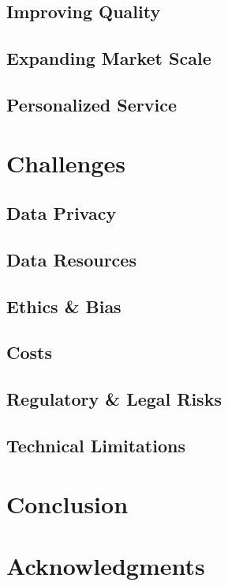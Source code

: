 \documentclass[fleqn,10pt]{SelfArx} %
\begin{document}
\subsection{Improving Quality}
\subsection{Expanding Market Scale}
\subsection{Personalized Service}

\section{Challenges}

\subsection{Data Privacy}
\subsection{Data Resources}
\subsection{Ethics \& Bias}
\subsection{Costs}
\subsection{Regulatory \& Legal Risks}
\subsection{Technical Limitations}

\section{Conclusion}

\lipsum[15-23] %


\section*{Acknowledgments} %
\end{document}
